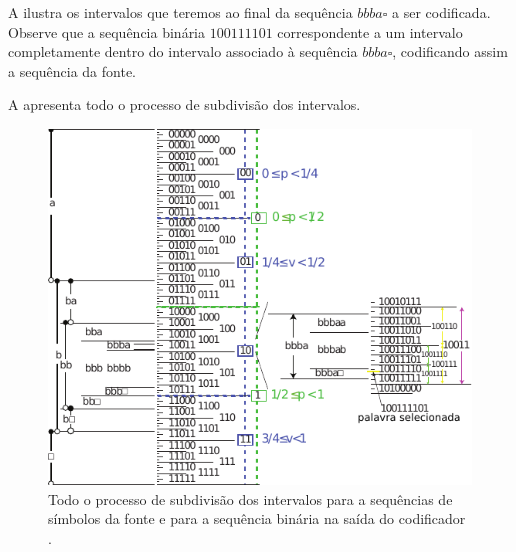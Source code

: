 \begin{example}
A  ilustra os intervalos que teremos ao final da sequência $bbba\square$
a ser codificada. Observe que a sequência binária $100111101$ correspondente a um
intervalo completamente dentro do intervalo associado à sequência $bbba\square$,
codificando assim a sequência da fonte.

A  apresenta todo o processo de subdivisão dos intervalos.
 
\begin{figure}[h!]
\centering
\includegraphics[width=\textwidth]{figures/bbbaall.pdf}
\caption{Todo o processo de subdivisão dos intervalos para a sequências de símbolos da fonte e para a sequência binária na saída do codificador \parencite{mackay2003}.}
\label{fig:bbbaall}
\end{figure}

\end{example}


